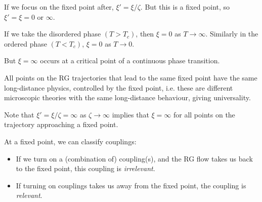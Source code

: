 \documentclass[12pt]{article}
\begin{document}
If we focus on the fixed point after, $\xi' = \xi/\zeta$. But this is a fixed point, so $\xi' = \xi = 0$ or $\infty$.

If we take the disordered phase $(T > T_c)$, then $\xi = 0$ as $T \to \infty$. Similarly in the ordered phase $(T < T_c)$, $\xi = 0$ as $T \to 0$.

But $\xi = \infty$ occurs at a critical point of a continuous phase transition.


\begin{center}
\end{center}

All points on the RG trajectories that lead to the same fixed point have the same long-distance physics, controlled by the fixed point, i.e. these are different microscopic theories with the same long-distance behaviour, giving universality.

Note that $\xi' = \xi/\zeta = \infty$ as $\zeta \to \infty$ implies that $\xi = \infty$ for all points on the trajectory approaching a fixed point.

At a fixed point, we can classify couplings:
\begin{itemize}
	\item If we turn on a (combination of) coupling(s), and the RG flow takes us back to the fixed point, this coupling is \emph{irrelevant}.
	\item If turning on couplings takes us away from the fixed point, the coupling is \emph{relevant}.
\end{itemize}
\end{document}
